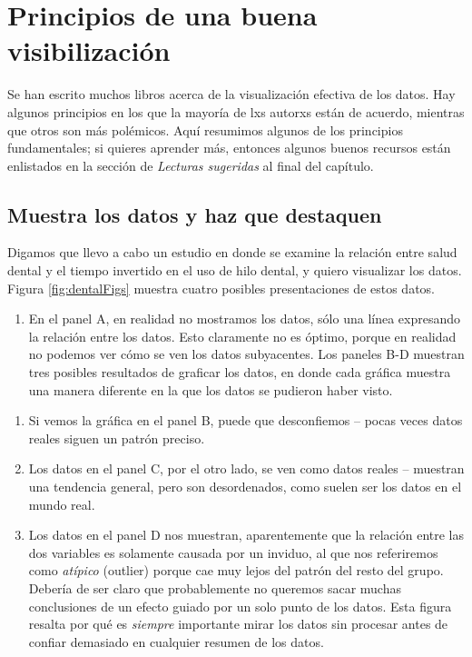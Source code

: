 \documentclass[
  12pt,
]{book}
\providecommand{\tightlist}{%
  \setlength{\itemsep}{0pt}\setlength{\parskip}{0pt}}
\theoremstyle{definition}
\theoremstyle{definition}
\theoremstyle{definition}
\theoremstyle{remark}
\begin{document}
\hypertarget{principios-de-una-buena-visibilizaciuxf3n}{%
\section{Principios de una buena visibilización}\label{principios-de-una-buena-visibilizaciuxf3n}}

Se han escrito muchos libros acerca de la visualización efectiva de los datos. Hay algunos principios en los que la mayoría de lxs autorxs están de acuerdo, mientras que otros son más polémicos. Aquí resumimos algunos de los principios fundamentales; si quieres aprender más, entonces algunos buenos recursos están enlistados en la sección de \emph{Lecturas sugeridas} al final del capítulo.

\hypertarget{muestra-los-datos-y-haz-que-destaquen}{%
\subsection{Muestra los datos y haz que destaquen}\label{muestra-los-datos-y-haz-que-destaquen}}

Digamos que llevo a cabo un estudio en donde se examine la relación entre salud dental y el tiempo invertido en el uso de hilo dental, y quiero visualizar los datos. Figura \ref{fig:dentalFigs} muestra cuatro posibles presentaciones de estos datos.

\begin{enumerate}
\def\labelenumi{\arabic{enumi}.}
\tightlist
\item
  En el panel A, en realidad no mostramos los datos, sólo una línea expresando la relación entre los datos. Esto claramente no es óptimo, porque en realidad no podemos ver cómo se ven los datos subyacentes.
  Los paneles B-D muestran tres posibles resultados de graficar los datos, en donde cada gráfica muestra una manera diferente en la que los datos se pudieron haber visto.
\end{enumerate}

\begin{enumerate}
\def\labelenumi{\arabic{enumi}.}
\setcounter{enumi}{1}
\item
  Si vemos la gráfica en el panel B, puede que desconfiemos -- pocas veces datos reales siguen un patrón preciso.
\item
  Los datos en el panel C, por el otro lado, se ven como datos reales -- muestran una tendencia general, pero son desordenados, como suelen ser los datos en el mundo real.
\item
  Los datos en el panel D nos muestran, aparentemente que la relación entre las dos variables es solamente causada por un inviduo, al que nos referiremos como \emph{atípico} (outlier) porque cae muy lejos del patrón del resto del grupo. Debería de ser claro que probablemente no queremos sacar muchas conclusiones de un efecto guiado por un solo punto de los datos. Esta figura resalta por qué es \emph{siempre} importante mirar los datos sin procesar antes de confiar demasiado en cualquier resumen de los datos.
\end{enumerate}
\end{document}
